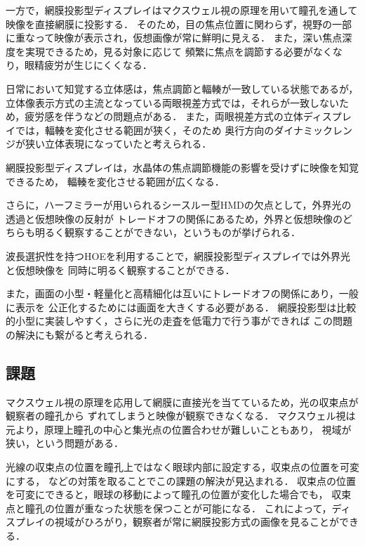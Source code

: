 \documentclass[dvipdfmx]{ujarticle}
\begin{document}
一方で，網膜投影型ディスプレイはマクスウェル視の原理を用いて瞳孔を通して映像を直接網膜に投影する．
そのため，目の焦点位置に関わらず，視野の一部に重なって映像が表示され，仮想画像が常に鮮明に見える．
また，深い焦点深度を実現できるため，見る対象に応じて
頻繁に焦点を調節する必要がなくなり，眼精疲労が生じにくくなる．

\cite{FIT2002}
\cite{ITE2011}
\cite{MedApp}
\cite{ITE2016}

日常において知覚する立体感は，焦点調節と輻輳が一致している状態であるが，
立体像表示方式の主流となっている両眼視差方式では，それらが一致しないため，疲労感を伴うなどの問題点がある．
また，両眼視差方式の立体ディスプレイでは，輻輳を変化させる範囲が狭く，そのため
奥行方向のダイナミックレンジが狭い立体表現になっていたと考えられる．

網膜投影型ディスプレイは，水晶体の焦点調節機能の影響を受けずに映像を知覚できるため，
輻輳を変化させる範囲が広くなる．

\cite{RetinalPSD}

さらに，ハーフミラーが用いられるシースルー型HMDの欠点として，外界光の透過と仮想映像の反射が
トレードオフの関係にあるため，外界と仮想映像のどちらも明るく観察することができない，というものが挙げられる．

波長選択性を持つHOEを利用することで，網膜投影型ディスプレイでは外界光と仮想映像を
同時に明るく観察することができる．

\cite{3DIC2000}

また，画面の小型・軽量化と高精細化は互いにトレードオフの関係にあり，一般に表示を
公正化するためには画面を大きくする必要がある．
網膜投影型は比較的小型に実装しやすく，さらに光の走査を低電力で行う事ができれば
この問題の解決にも繋がると考えられる．

\subsection{課題}
マクスウェル視の原理を応用して網膜に直接光を当てているため，光の収束点が観察者の瞳孔から
ずれてしまうと映像が観察できなくなる．
マクスウェル視は元より，原理上瞳孔の中心と集光点の位置合わせが難しいこともあり，
視域が狭い，という問題がある．

光線の収束点の位置を瞳孔上ではなく眼球内部に設定する，収束点の位置を可変にする，
などの対策を取ることでこの課題の解決が見込まれる．
収束点の位置を可変にできると，眼球の移動によって瞳孔の位置が変化した場合でも，
収束点と瞳孔の位置が重なった状態を保つことが可能になる．
これによって，ディスプレイの視域がひろがり，観察者が常に網膜投影方式の画像を見ることができる．
\end{document}
